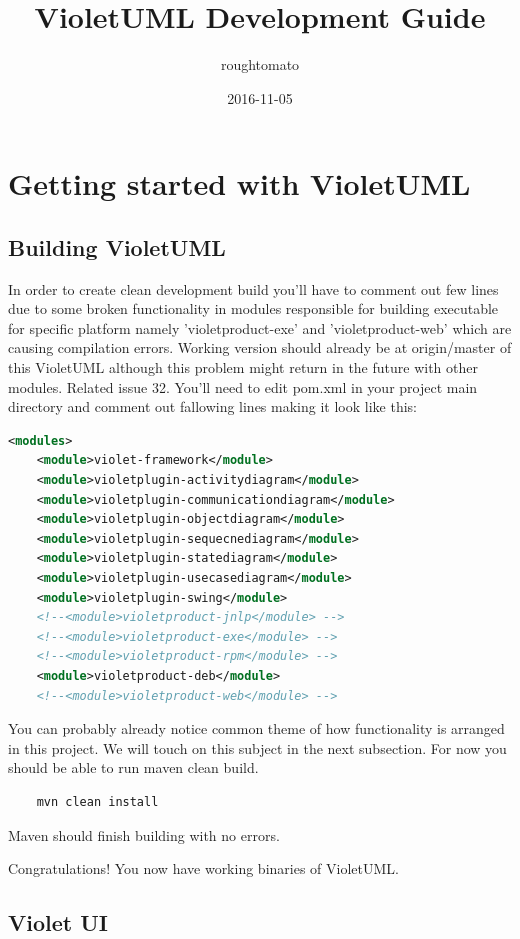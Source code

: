 \documentclass{article}
\title{VioletUML Development Guide}
\date{2016-11-05}
\author{roughtomato}
\begin{document}
  \maketitle
  \newpage

\section{Getting started with VioletUML}
\subsection{Building VioletUML}

In order to create clean development build you'll have to comment out few lines due to some broken functionality in modules responsible for
building executable for specific platform namely 'violetproduct-exe' and 'violetproduct-web' which are causing compilation errors.
Working version should already be at origin/master of this VioletUML although this problem might return in the future with other modules.
Related issue 32. You'll need to edit pom.xml in your project main directory and comment out fallowing lines making it look like this:
\begin{lstlisting}[language=XML]
<modules>
	<module>violet-framework</module>
	<module>violetplugin-activitydiagram</module>
	<module>violetplugin-communicationdiagram</module>
	<module>violetplugin-objectdiagram</module>
	<module>violetplugin-sequecnediagram</module>
	<module>violetplugin-statediagram</module>
	<module>violetplugin-usecasediagram</module>
	<module>violetplugin-swing</module>
	<!--<module>violetproduct-jnlp</module> -->
	<!--<module>violetproduct-exe</module> -->
	<!--<module>violetproduct-rpm</module> -->
	<module>violetproduct-deb</module>
	<!--<module>violetproduct-web</module> -->
\end{lstlisting}

You can probably already notice common theme of how functionality is arranged in this project. We will touch on this subject in the next subsection.
For now you should be able to run maven clean build.
\begin{lstlisting}
	mvn clean install
\end{lstlisting}
Maven should finish building with no errors.

Congratulations! You now have working binaries of VioletUML.

\subsection{Violet UI}
\end{document}
